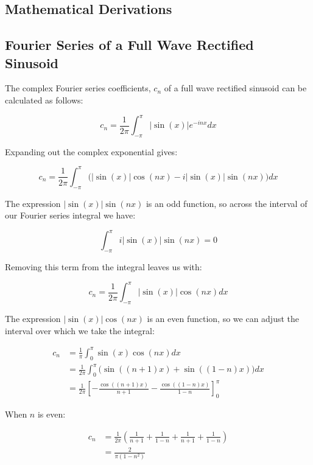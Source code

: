 \begin{appendices}
\chapter{Mathematical Derivations}
\label{app:MathematicalDerivations}
	\section{Fourier Series of a Full Wave Rectified Sinusoid}
	\label{app:MathematicalDerivations-Rectification}
		The complex Fourier series coefficients, $c_{n}$ of a full wave rectified sinusoid can be calculated as
		follows:

		\[ c_{n} = \frac{1}{2\pi} \int_{-\pi}^{\pi} |\sin(x)|e^{-inx} dx \]

		Expanding out the complex exponential gives:

		\[ c_{n} = \frac{1}{2\pi} \int_{-\pi}^{\pi} \bigl( |\sin(x)|\cos(nx) - i|\sin(x)|\sin(nx) \bigr) dx \]

		The expression $|\sin(x)|\sin(nx)$ is an odd function, so across the interval of our Fourier series integral
		we have:

		\[ \int_{-\pi}^{\pi} i|\sin(x)|\sin(nx) = 0 \]

		Removing this term from the integral leaves us with:

		\[ c_{n} = \frac{1}{2\pi} \int_{-\pi}^{\pi} |\sin(x)|\cos(nx) dx \]

		The expression $|\sin(x)|\cos(nx)$ is an even function, so we can adjust the interval over which we take the
		integral:

		\begin{align}
			c_{n} & = \frac{1}{\pi} \int_{0}^{\pi} \sin(x)\cos(nx) dx \nonumber \\[0.6em]
			& = \frac{1}{2\pi} \int_{0}^{\pi} \bigl( \sin((n+1)x) + \sin((1-n)x) \bigr) dx \nonumber \\[0.6em]
			& = \frac{1}{2\pi} \left[ -\frac{\cos((n+1)x)}{n+1} - 
				\frac{\cos((1-n)x)}{1-n} \right]_{0}^{\pi} \nonumber
		\end{align}

		\newpage
		When $n$ is even:

		\begin{align}
			c_{n} & = \frac{1}{2\pi} \left( \frac{1}{n+1} + \frac{1}{1-n} 
				+ \frac{1}{n+1} + \frac{1}{1-n} \right) \nonumber \\[0.6em]
			& = \frac{2}{\pi(1 - n^{2})} \nonumber
		\end{align}


\end{appendices}
